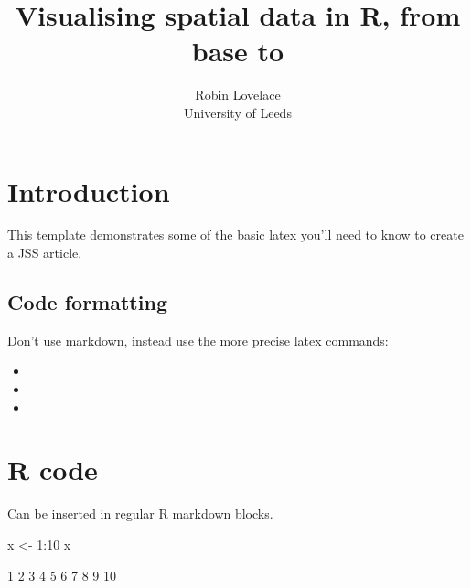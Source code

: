 \documentclass[article]{jss}
\author{
Robin Lovelace\\University of Leeds
}
\title{Visualising spatial data in R, from base to \pkg{shiny}}
\providecommand{\tightlist}{%
  \setlength{\itemsep}{0pt}\setlength{\parskip}{0pt}}
\begin{document}
\section{Introduction}\label{introduction}

This template demonstrates some of the basic latex you'll need to know
to create a JSS article.

\subsection{Code formatting}\label{code-formatting}

Don't use markdown, instead use the more precise latex commands:

\begin{itemize}
\tightlist
\item
\item
\item
\end{itemize}

\section{R code}\label{r-code}

Can be inserted in regular R markdown blocks.

\begin{CodeChunk}
\begin{CodeInput}
x <- 1:10
x
\end{CodeInput}
\begin{CodeOutput}
 [1]  1  2  3  4  5  6  7  8  9 10
\end{CodeOutput}
\end{CodeChunk}
\end{document}
